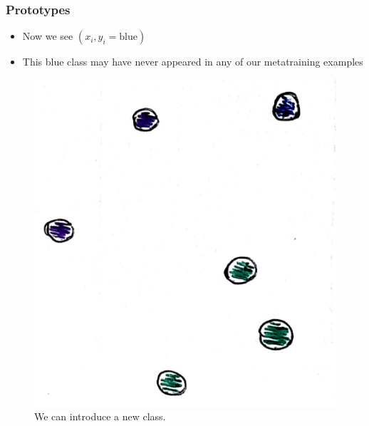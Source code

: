 \documentclass[10pt,mathserif]{beamer}
\begin{document}
\begin{frame}
  \frametitle{Prototypes}
 \begin{itemize}
   \item Now we see $\left(x_i, y_i = \text{blue}\right)$
 \item This blue class may have never appeared in any of our metatraining
   examples
 \end{itemize} 
\begin{figure}[ht]
  \centering
  \includegraphics[width=0.7\paperwidth]{figure/prototypes_4}
  \caption{We can introduce a new class.\label{fig:prototypes_4} }
\end{figure}
\end{frame}
\end{document}
